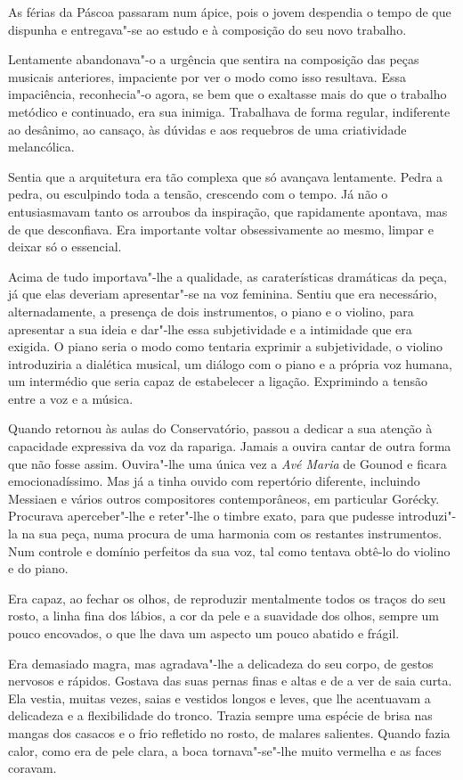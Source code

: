 As férias da Páscoa passaram num ápice, pois o jovem despendia o tempo
de que dispunha e entregava"-se ao estudo e à composição do seu novo
trabalho.

Lentamente abandonava"-o a urgência que sentira na composição das peças
musicais anteriores, impaciente por ver o modo como isso resultava. Essa
impaciência, reconhecia"-o agora, se bem que o exaltasse mais do que o
trabalho metódico e continuado, era sua inimiga. Trabalhava de forma
regular, indiferente ao desânimo, ao cansaço, às dúvidas e aos requebros
de uma criatividade melancólica.

Sentia que a arquitetura era tão complexa que só avançava lentamente.
Pedra a pedra, ou esculpindo toda a tensão, crescendo com o tempo. Já
não o entusiasmavam tanto os arroubos da inspiração, que rapidamente
apontava, mas de que desconfiava. Era importante voltar obsessivamente
ao mesmo, limpar e deixar só o essencial.

Acima de tudo importava"-lhe a qualidade, as caraterísticas dramáticas
da peça, já que elas deveriam apresentar"-se na voz feminina. Sentiu que
era necessário, alternadamente, a presença de dois instrumentos, o piano
e o violino, para apresentar a sua ideia e dar"-lhe essa subjetividade e
a intimidade que era exigida. O piano seria o modo como tentaria
exprimir a subjetividade, o violino introduziria a dialética musical,
um diálogo com o piano e a própria voz humana, um intermédio que seria
capaz de estabelecer a ligação. Exprimindo a tensão entre a voz e a
música.

Quando retornou às aulas do Conservatório, passou a dedicar a sua
atenção à capacidade expressiva da voz da rapariga. Jamais a ouvira
cantar de outra forma que não fosse assim. Ouvira"-lhe uma única vez a
\emph{Avé Maria} de Gounod e ficara emocionadíssimo. Mas já a tinha
ouvido com repertório diferente, incluindo Messiaen e vários outros
compositores contemporâneos, em particular Gorécky. Procurava
aperceber"-lhe e reter"-lhe o timbre exato, para que pudesse introduzi"-la
na sua peça, numa procura de uma harmonia com os restantes instrumentos.
Num controle e domínio perfeitos da sua voz, tal como tentava obtê-lo do
violino e do piano.

Era capaz, ao fechar os olhos, de reproduzir mentalmente todos os traços
do seu rosto, a linha fina dos lábios, a cor da pele e a suavidade dos
olhos, sempre um pouco encovados, o que lhe dava um aspecto um pouco
abatido e frágil.

Era demasiado magra, mas agradava"-lhe a delicadeza do seu corpo, de
gestos nervosos e rápidos. Gostava das suas pernas finas e altas e de a
ver de saia curta. Ela vestia, muitas vezes, saias e vestidos longos e
leves, que lhe acentuavam a delicadeza e a flexibilidade do tronco.
Trazia sempre uma espécie de brisa nas mangas dos casacos e o frio
refletido no rosto, de malares salientes. Quando fazia calor, como era
de pele clara, a boca tornava"-se"-lhe muito vermelha e as faces coravam.

